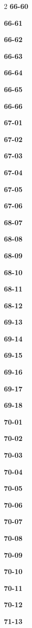 \documentclass[10pt,a4paper]{article}
\begin{document}
\begin{multicols}{2}
\noindent\textbf{66-60}\ \par
\noindent\textbf{66-61}\ \par
\noindent\textbf{66-62}\ \par
\noindent\textbf{66-63}\ \par
\noindent\textbf{66-64}\ \par
\noindent\textbf{66-65}\ \par
\noindent\textbf{66-66}\ \par
\noindent\textbf{67-01}\ \par
\noindent\textbf{67-02}\ \par
\noindent\textbf{67-03}\ \par
\noindent\textbf{67-04}\ \par
\noindent\textbf{67-05}\ \par
\noindent\textbf{67-06}\ \par
\noindent\textbf{68-07}\ \par
\noindent\textbf{68-08}\ \par
\noindent\textbf{68-09}\ \par
\noindent\textbf{68-10}\ \par
\noindent\textbf{68-11}\ \par
\noindent\textbf{68-12}\ \par
\noindent\textbf{69-13}\ \par
\noindent\textbf{69-14}\ \par
\noindent\textbf{69-15}\ \par
\noindent\textbf{69-16}\ \par
\noindent\textbf{69-17}\ \par
\noindent\textbf{69-18}\ \par
\noindent\textbf{70-01}\ \par
\noindent\textbf{70-02}\ \par
\noindent\textbf{70-03}\ \par
\noindent\textbf{70-04}\ \par
\noindent\textbf{70-05}\ \par
\noindent\textbf{70-06}\ \par
\noindent\textbf{70-07}\ \par
\noindent\textbf{70-08}\ \par
\noindent\textbf{70-09}\ \par
\noindent\textbf{70-10}\ \par
\noindent\textbf{70-11}\ \par
\noindent\textbf{70-12}\ \par
\noindent\textbf{71-13}\ \par

\end{multicols}
\end{document}
